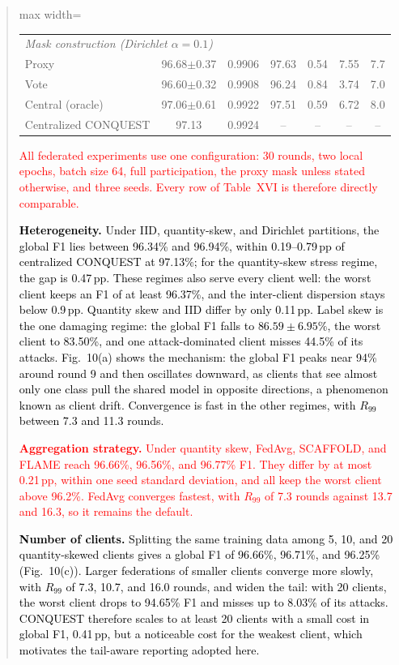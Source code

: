 \documentclass[11pt]{article}
\newenvironment{excerpt}{\begin{quote}\sloppy}{\end{quote}}
\begin{document}
\begin{excerpt}
\begin{table}[H]
\begin{adjustbox}{max width=\linewidth}
\begin{tabular}{lcccccc}
\midrule
\multicolumn{7}{l}{\textit{Mask construction (Dirichlet $\alpha{=}0.1$)}} \\
Proxy & 96.68$\pm$0.37 & 0.9906 & 97.63 & 0.54 & 7.55 & 7.7 \\
Vote & 96.60$\pm$0.32 & 0.9908 & 96.24 & 0.84 & 3.74 & 7.0 \\
Central (oracle) & 97.06$\pm$0.61 & 0.9922 & 97.51 & 0.59 & 6.72 & 8.0 \\
\midrule
Centralized CONQUEST & 97.13 & 0.9924 & -- & -- & -- & -- \\
\hline\toprule
\end{tabular}
\end{adjustbox}
\end{table}

\textcolor{red}{All federated experiments
use one configuration: 30 rounds, two local epochs, batch size 64,
full participation, the proxy mask unless stated otherwise, and three
seeds. Every row of Table~XVI is
therefore directly comparable.}

\textcolor{black}{\textbf{Heterogeneity.} Under IID,
quantity-skew, and Dirichlet partitions, the global F1 lies between
96.34\% and 96.94\%, within 0.19--0.79\,pp of centralized CONQUEST at
97.13\%; for the quantity-skew stress regime, the gap is 0.47\,pp.
These regimes also serve every client well: the worst client keeps an
F1 of at least 96.37\%, and the inter-client dispersion stays below
0.9\,pp. Quantity skew and IID differ by only 0.11\,pp. Label skew is the one
damaging regime: the global F1 falls to $86.59\pm6.95\%$, the worst
client to 83.50\%, and one attack-dominated client misses 44.5\% of
its attacks. Fig.~10(a) shows the mechanism:
the global F1 peaks near 94\% around round 9 and then oscillates
downward, as clients that see almost only one class pull the shared
model in opposite directions, a phenomenon known as client drift.
Convergence is fast in the other regimes, with $R_{99}$ between 7.3
and 11.3 rounds.}

\textcolor{red}{\textbf{Aggregation
strategy.} Under quantity skew, FedAvg, SCAFFOLD, and FLAME reach
96.66\%, 96.56\%, and 96.77\% F1. They differ by at most 0.21\,pp,
within one seed standard deviation, and all keep the worst client
above 96.2\%. FedAvg converges fastest, with $R_{99}$ of 7.3 rounds
against 13.7 and 16.3, so it remains the default.}

\textcolor{black}{\textbf{Number of clients.} Splitting the
same training data among 5, 10, and 20 quantity-skewed clients gives a
global F1 of 96.66\%, 96.71\%, and 96.25\%
(Fig.~10(c)). Larger federations of smaller
clients converge more slowly, with $R_{99}$ of 7.3, 10.7, and 16.0
rounds, and widen the tail: with 20 clients, the worst client drops to
94.65\% F1 and misses up to 8.03\% of its attacks. CONQUEST therefore
scales to at least 20 clients with a small cost in global F1,
0.41\,pp, but a noticeable cost for the weakest client, which
motivates the tail-aware reporting adopted here.}


\end{excerpt}
\end{document}
